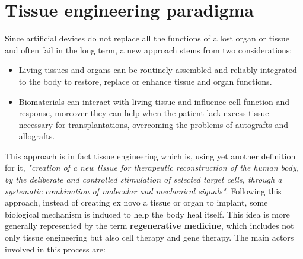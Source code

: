 \section{Tissue engineering paradigma}
Since artificial devices do not replace all the functions of a lost organ or tissue and often fail in the long term, a new approach stems from two considerations:

\begin{multicols}{2}
  \begin{itemize}
    \item Living tissues and organs can be routinely assembled and reliably integrated to the body to restore, replace or enhance tissue and organ functions.
    \item Biomaterials can interact with living tissue and influence cell function and response, moreover they can help when the patient lack excess tissue necessary for transplantations, overcoming the problems of autografts and allografts.
  \end{itemize}
\end{multicols}

This approach is in fact tissue engineering which is, using yet another definition for it, \textit{"creation of a new tissue for therapeutic reconstruction of the human body, by the deliberate and controlled stimulation of selected target cells, through a systematic combination of molecular and mechanical signals"}.
Following this approach, instead of creating ex novo a tissue or organ to implant, some biological mechanism is induced to help the body heal itself.
This idea is more generally represented by the term \textbf{regenerative medicine}, which includes not only tissue engineering but also cell therapy and gene therapy.
The main actors involved in this process are:

